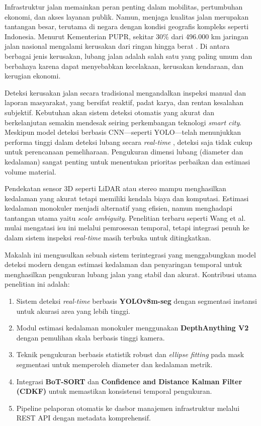 \documentclass{iopjournal}
\begin{document}
Infrastruktur jalan memainkan peran penting dalam mobilitas, pertumbuhan ekonomi, dan akses layanan publik. Namun, menjaga kualitas jalan merupakan tantangan besar, terutama di negara dengan kondisi geografis kompleks seperti Indonesia. Menurut Kementerian PUPR, sekitar 30\% dari 496.000 km jaringan jalan nasional mengalami kerusakan dari ringan hingga berat \cite{kemenpupr}. Di antara berbagai jenis kerusakan, lubang jalan adalah salah satu yang paling umum dan berbahaya karena dapat menyebabkan kecelakaan, kerusakan kendaraan, dan kerugian ekonomi.

Deteksi kerusakan jalan secara tradisional mengandalkan inspeksi manual dan laporan masyarakat, yang bersifat reaktif, padat karya, dan rentan kesalahan subjektif. Kebutuhan akan sistem deteksi otomatis yang akurat dan berkelanjutan semakin mendesak seiring perkembangan teknologi \textit{smart city}. Meskipun model deteksi berbasis CNN—seperti YOLO—telah menunjukkan performa tinggi dalam deteksi lubang secara \textit{real-time} \cite{gorro2024}, deteksi saja tidak cukup untuk perencanaan pemeliharaan. Pengukuran dimensi lubang (diameter dan kedalaman) sangat penting untuk menentukan prioritas perbaikan dan estimasi volume material.

Pendekatan sensor 3D seperti LiDAR atau stereo mampu menghasilkan kedalaman yang akurat tetapi memiliki kendala biaya dan komputasi. Estimasi kedalaman monokuler menjadi alternatif yang efisien, namun menghadapi tantangan utama yaitu \textit{scale ambiguity}. Penelitian terbaru seperti Wang et al. \cite{wang2025} mulai mengatasi isu ini melalui pemrosesan temporal, tetapi integrasi penuh ke dalam sistem inspeksi \textit{real-time} masih terbuka untuk ditingkatkan.

Makalah ini mengusulkan sebuah sistem terintegrasi yang menggabungkan model deteksi modern dengan estimasi kedalaman dan penyaringan temporal untuk menghasilkan pengukuran lubang jalan yang stabil dan akurat. Kontribusi utama penelitian ini adalah:
\begin{enumerate}
    \item Sistem deteksi \textit{real-time} berbasis \textbf{YOLOv8m-seg} dengan segmentasi instansi untuk akurasi area yang lebih tinggi.
    \item Modul estimasi kedalaman monokuler menggunakan \textbf{DepthAnything V2} dengan pemulihan skala berbasis tinggi kamera.
    \item Teknik pengukuran berbasis statistik robust dan \textit{ellipse fitting} pada mask segmentasi untuk memperoleh diameter dan kedalaman metrik.
    \item Integrasi \textbf{BoT-SORT} dan \textbf{Confidence and Distance Kalman Filter (CDKF)} untuk memastikan konsistensi temporal pengukuran.
    \item Pipeline pelaporan otomatis ke dasbor manajemen infrastruktur melalui REST API dengan metadata komprehensif.
\end{enumerate}
\end{document}
